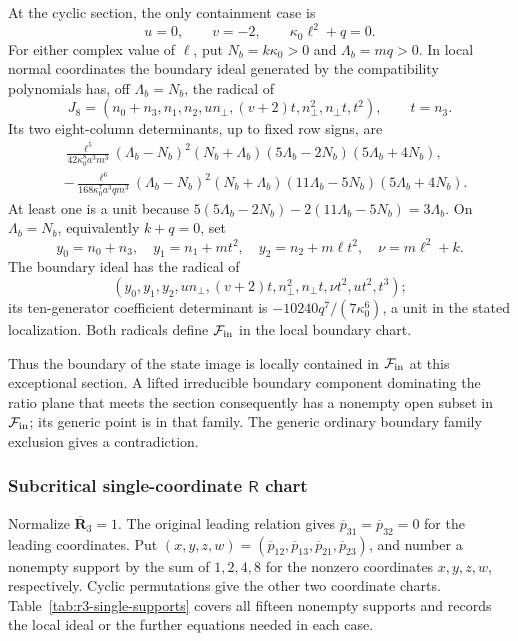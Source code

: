 \documentclass[11pt,a4paper]{article}
\numberwithin{equation}{section}
\theoremstyle{plain}
\theoremstyle{definition}
\theoremstyle{remark}
\begin{document}
At the cyclic section, the only containment case is
\[
       u=0,\qquad v=-2,\qquad \kappa_0 \ell^2+q=0.
\]
For either complex value of $\ell$, put
$N_b=k\kappa_0 >0$ and $\Lambda_b=mq>0$. In local normal coordinates the
boundary ideal generated by the compatibility polynomials has, off $\Lambda_b=N_b$, the radical
of
\[
 J_8=(n_0+n_3,n_1,n_2,un_\perp,(v+2)t,n_\perp^2,n_\perp t,t^2),
 \qquad t=n_3.
\]
Its two eight-column determinants, up to fixed row signs, are
\begin{align*}
 &\frac{\ell^5}{42\kappa_0 ^8a^3m^3}
  (\Lambda_b-N_b)^2(N_b+\Lambda_b)
  (5\Lambda_b-2N_b)(5\Lambda_b+4N_b),\\
 &-\frac{\ell^6}{168\kappa_0 ^7a^3qm^3}
  (\Lambda_b-N_b)^2(N_b+\Lambda_b)
  (11\Lambda_b-5N_b)(5\Lambda_b+4N_b).
\end{align*}
At least one is a unit because
$5(5\Lambda_b-2N_b)-2(11\Lambda_b-5N_b)=3\Lambda_b$.
On $\Lambda_b=N_b$, equivalently $k+q=0$, set
\[
 y_0=n_0+n_3,\quad y_1=n_1+mt^2,\quad
 y_2=n_2+m\ell t^2,\quad \nu=m\ell^2+k .
\]
The boundary ideal has the radical of
\[
 (y_0,y_1,y_2,un_\perp,(v+2)t,n_\perp^2,n_\perp t,\nu t^2,ut^2,t^3);
\]
its ten-generator coefficient determinant is
$-10240q^7/(7\kappa_0 ^6)$, a unit in the stated localization. Both radicals define
$\mathcal F_{\rm in}$ in the local boundary chart.

Thus the boundary of the state image is locally contained in
$\mathcal F_{\rm in}$ at this exceptional section. A lifted
irreducible boundary component dominating the ratio plane that meets
the section consequently has a nonempty open subset in
$\mathcal F_{\rm in}$; its generic point is in that family. The
generic ordinary boundary family exclusion gives a contradiction.

\subsubsection{Subcritical single-coordinate $\mathsf R$ chart}

Normalize $\overline{\boldsymbol R}_3=1$. The original leading relation gives $\overline p_{31}=\overline p_{32}=0$ for the leading coordinates. Put $(x,y,z,w)=(\overline p_{12},\overline p_{13},\overline p_{21},\overline p_{23})$, and number a nonempty support by the sum of $1,2,4,8$ for the nonzero coordinates $x,y,z,w$, respectively. Cyclic permutations give the other two coordinate charts.
Table~\ref{tab:r3-single-supports} covers all fifteen nonempty supports
and records the local ideal or the further equations needed in each case.
\end{document}
